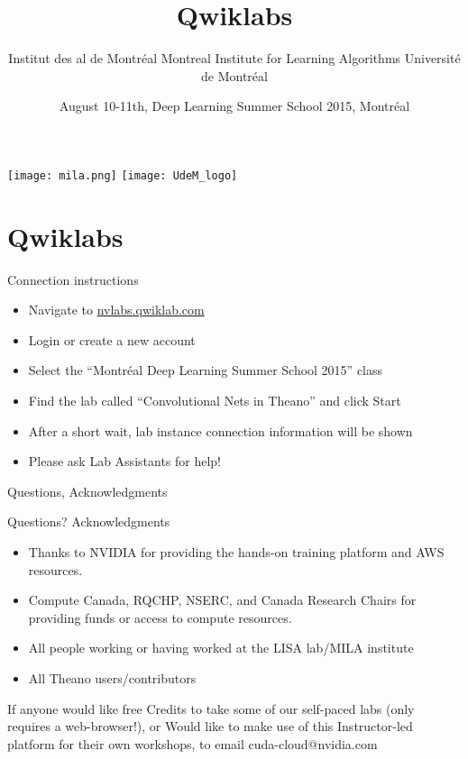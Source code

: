 \documentclass[utf8x,xcolor=pdftex,dvipsnames,table]{beamer}
\title{Qwiklabs}
\author{%
\footnotesize
\newline
\newline
Institut des al de Montréal \newline
Montreal Institute for Learning Algorithms \newline
Université de Montréal
}
\date{August 10-11th, Deep Learning Summer School 2015, Montréal}
\begin{document}
\begin{frame}[plain]
 \titlepage
 \vspace{-2em}
 \texttt{[image: mila.png]}
 \hfill
 \texttt{[image: UdeM\_logo]}
\end{frame}

\section{Qwiklabs}
\begin{frame}{Connection instructions}
\begin{itemize}
\item Navigate to \url{nvlabs.qwiklab.com}
\item Login or create a new account
\item Select the ``Montréal Deep Learning Summer School 2015'' class
\item Find the lab called ``Convolutional Nets in Theano'' and click Start
\item After a short wait, lab instance connection information will be shown
\item Please ask Lab Assistants for help!
\end{itemize}
\end{frame}

\begin{frame}{Questions, Acknowledgments}
\huge
\begin{center}
Questions?\newline
Acknowledgments
\end{center}
\normalsize
\begin{itemize}
\item Thanks to NVIDIA for providing the hands-on training platform and AWS resources.
\item Compute Canada, RQCHP, NSERC, and Canada Research Chairs for providing funds or access to compute resources.
\item All people working or having worked at the LISA lab/MILA institute
\item All Theano users/contributors
\end{itemize}

\begin{small}
If anyone would like free Credits to take some of our self-paced labs (only requires a web-browser!), or
Would like to make use of this Instructor-led platform for their own workshops, to email cuda-cloud@nvidia.com
\end{small}
\end{frame}
\end{document}
